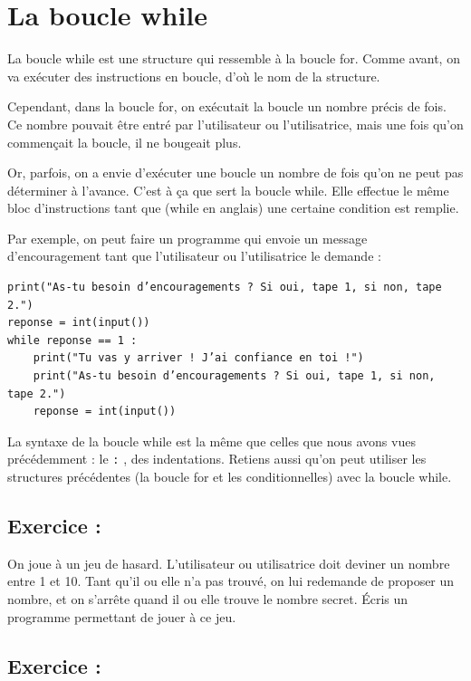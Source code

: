 \documentclass[a4paper,french,11pt]{article}
\begin{document}
\hypertarget{la-boucle-while}{%
\section{La boucle while}\label{la-boucle-while}}

La boucle while est une structure qui ressemble à la boucle for. Comme
avant, on va exécuter des instructions en boucle, d'où le nom de la
structure.

Cependant, dans la boucle for, on exécutait la boucle un nombre précis
de fois. Ce nombre pouvait être entré par l'utilisateur ou
l'utilisatrice, mais une fois qu'on commençait la boucle, il ne bougeait
plus.

Or, parfois, on a envie d'exécuter une boucle un nombre de fois qu'on ne
peut pas déterminer à l'avance. C'est à ça que sert la boucle while.
Elle effectue le même bloc d'instructions tant que (while en anglais)
une certaine condition est remplie.

Par exemple, on peut faire un programme qui envoie un message
d'encouragement tant que l'utilisateur ou l'utilisatrice le demande :

\begin{verbatim}
print("As-tu besoin d’encouragements ? Si oui, tape 1, si non, tape 2.")
reponse = int(input())
while reponse == 1 :
    print("Tu vas y arriver ! J’ai confiance en toi !")
    print("As-tu besoin d’encouragements ? Si oui, tape 1, si non, tape 2.")
    reponse = int(input())
\end{verbatim}

La syntaxe de la boucle while est la même que celles que nous avons vues
précédemment : le \texttt{:} , des indentations. Retiens
aussi qu'on peut utiliser les structures précédentes (la boucle for et
les conditionnelles) avec la boucle while.

\hypertarget{exercice-17}{%
\subsection{Exercice :}\label{exercice-17}}

On joue à un jeu de hasard. L'utilisateur ou utilisatrice doit deviner
un nombre entre 1 et 10. Tant qu'il ou elle n'a pas trouvé, on lui
redemande de proposer un nombre, et on s'arrête quand il ou elle trouve
le nombre secret. Écris un programme permettant de jouer à ce jeu.

\hypertarget{exercice-18}{%
\subsection{Exercice :}\label{exercice-18}}
\end{document}
